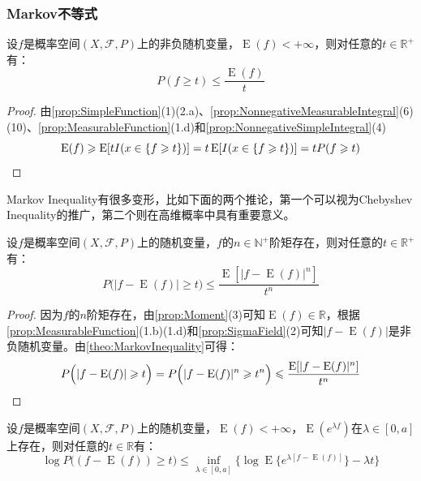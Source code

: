 \subsubsection{Markov不等式}
\begin{theorem}\label{theo:MarkovInequality}
	设$f$是概率空间$(X,\mathscr{F},P)$上的非负随机变量，$\operatorname{E}(f)<+\infty$，则对任意的$t\in\mathbb{R}^{+}$有：
	\begin{equation*}
		P(f\geqslant t)\leqslant\frac{\operatorname{E}(f)}{t}
	\end{equation*}
\end{theorem}
\begin{proof}
	由\cref{prop:SimpleFunction}(1)(2.a)、\cref{prop:NonnegativeMeasurableIntegral}(6)(10)、\cref{prop:MeasurableFunction}(1.d)和\cref{prop:NonnegativeSimpleIntegral}(4)
	\begin{equation*}
		\operatorname{E}(f)\geqslant\operatorname{E}[tI(x\in\{f\geqslant t\})]=t\operatorname{E}[I(x\in\{f\geqslant t\})]=tP(f\geqslant t)\qedhere
	\end{equation*}
\end{proof}
\begin{note}
	Markov Inequality有很多变形，比如下面的两个推论，第一个可以视为Chebyshev Inequality的推广，第二个则在高维概率中具有重要意义。
\end{note}
\begin{corollary}\label{cor:ChebyshevInequality}
	设$f$是概率空间$(X,\mathscr{F},P)$上的随机变量，$f$的$n\in\mathbb{N}^+$阶矩存在，则对任意的$t\in\mathbb{R}^{+}$有：
	\begin{equation*}
		P\Big(|f-\operatorname{E}(f)|\geqslant t\Big)\leqslant\frac{\operatorname{E}[|f-\operatorname{E}(f)|^n]}{t^n}
	\end{equation*}
\end{corollary}
\begin{proof}
	因为$f$的$n$阶矩存在，由\cref{prop:Moment}(3)可知$\operatorname{E}(f)\in\mathbb{R}$，根据\cref{prop:MeasurableFunction}(1.b)(1.d)和\cref{prop:SigmaField}(2)可知$|f-\operatorname{E}(f)|$是非负随机变量。由\cref{theo:MarkovInequality}可得：
	\begin{equation*}
		P\Big(|f-\operatorname{E}(f)|\geqslant t\Big)=P\Big(|f-\operatorname{E}(f)|^n\geqslant t^n\Big)\leqslant\frac{\operatorname{E}[|f-\operatorname{E}(f)|^n]}{t^n}\qedhere
	\end{equation*}
\end{proof}
\begin{corollary}\label{cor:ChernoffBound}
	设$f$是概率空间$(X,\mathscr{F},P)$上的随机变量，$\operatorname{E}(f)<+\infty$，$\operatorname{E}(e^{\lambda f})$在$\lambda\in[0,a]$上存在，则对任意的$t\in\mathbb{R}$有：
	\begin{equation*}
		\log P\Big((f-\operatorname{E}(f))\geqslant t\Big)\leqslant\inf_{\lambda\in[0,a]}\Big\{\log\operatorname{E}\{e^{\lambda[f-\operatorname{E}(f)]}\}-\lambda t\Big\}
	\end{equation*}
\end{corollary}
